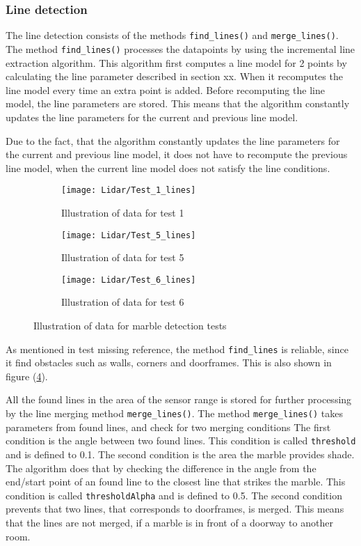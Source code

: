 \documentclass[../Head/Main.tex]{subfiles}
\begin{document}
\subsubsection{Line detection}
The line detection consists of the methods \texttt{find\_lines()} and \texttt{merge\_lines()}.\\
The method \texttt{find\_lines()} processes the datapoints by using the incremental line extraction algorithm. This algorithm first computes a line model for 2 points by calculating the line parameter described in section xx. When it recomputes the line model every time an extra point is added. Before recomputing the line model, the line parameters are stored. This means that the algorithm constantly updates the line parameters for the current and previous line model.\par
Due to the fact, that the algorithm constantly updates the line parameters for the current and previous line model, it does not have to recompute the previous line model, when the current line model does not satisfy the line conditions.
\begin{figure}[H]
  \begin{subfigure}[b]{0.3\textwidth}
  	\centering
    \texttt{[image: Lidar/Test\_1\_lines]}
    \caption{Illustration of data for test 1}
    \label{fig:LineTest1}
  \end{subfigure}
  \hfill
  \begin{subfigure}[b]{0.3\textwidth}
  	\centering
    \texttt{[image: Lidar/Test\_5\_lines]}
    \caption{Illustration of data for test 5}
    \label{fig:LineTest5}
  \end{subfigure}
  \hfill
  \begin{subfigure}[b]{0.3\textwidth}
    \centering
    \texttt{[image: Lidar/Test\_6\_lines]}
    \caption{Illustration of data for test 6}
    \label{fig:LineTest6}
  \end{subfigure}
  \caption{Illustration of data for marble detection tests}
  \label{fig:LineTests}
\end{figure}
As mentioned in test {\color{red} missing reference}, the method \texttt{find\_lines} is reliable, since it find obstacles such as walls, corners and doorframes. This is also shown in figure (\ref{fig:LineTests}).\par
All the found lines in the area of the sensor range is stored for further processing by the line merging method \texttt{merge\_lines()}.
The method \texttt{merge\_lines()} takes parameters from found lines, and check for two merging conditions The first condition is the angle between two found lines. This condition is called \texttt{threshold} and is defined to 0.1. The second condition is the area the marble provides shade. The algorithm does that by checking the difference in the angle from the end/start point of an found line to the closest line that strikes the marble. This condition is called \texttt{thresholdAlpha} and is defined to 0.5. The second condition prevents that two lines, that corresponds to doorframes, is merged. This means that the lines are not merged, if a marble is in front of a doorway to another room.\par
\end{document}
